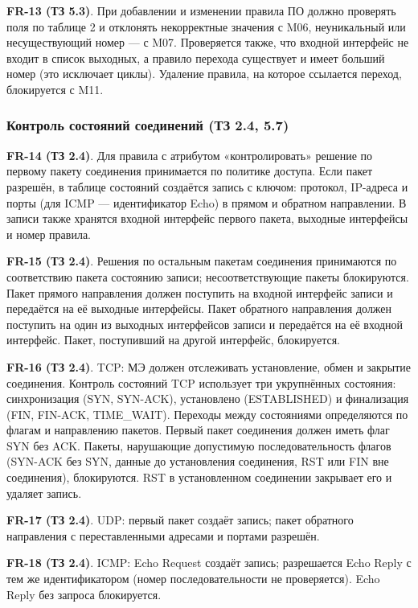 \documentclass[13pt,a4paper,final]{article}
\begin{document}
	\textbf{FR-13 (ТЗ 5.3)}. При добавлении и изменении правила ПО должно проверять поля по таблице 2 и отклонять некорректные значения с M06, неуникальный или несуществующий номер — с M07. Проверяется также, что входной интерфейс не входит в список выходных, а правило перехода существует и имеет больший номер (это исключает циклы). Удаление правила, на которое ссылается переход, блокируется с M11.
	
	\subsubsection{Контроль состояний соединений (ТЗ 2.4, 5.7)}
	
	\textbf{FR-14 (ТЗ 2.4)}. Для правила с атрибутом «контролировать» решение по первому пакету соединения принимается по политике доступа. Если пакет разрешён, в таблице состояний создаётся запись с ключом: протокол, IP-адреса и порты (для ICMP — идентификатор Echo) в прямом и обратном направлении. В записи также хранятся входной интерфейс первого пакета, выходные интерфейсы и номер правила.
	
	\textbf{FR-15 (ТЗ 2.4)}. Решения по остальным пакетам соединения принимаются по соответствию пакета состоянию записи; несоответствующие пакеты блокируются. Пакет прямого направления должен поступить на входной интерфейс записи и передаётся на её выходные интерфейсы. Пакет обратного направления должен поступить на один из выходных интерфейсов записи и передаётся на её входной интерфейс. Пакет, поступивший на другой интерфейс, блокируется.
	
	\textbf{FR-16 (ТЗ 2.4)}. TCP: МЭ должен отслеживать установление, обмен и закрытие соединения. Контроль состояний TCP использует три укрупнённых состояния: синхронизация (SYN, SYN-ACK), установлено (ESTABLISHED) и финализация (FIN, FIN-ACK, TIME\_WAIT). Переходы между состояниями определяются по флагам и направлению пакетов. Первый пакет соединения должен иметь флаг SYN без ACK. Пакеты, нарушающие допустимую последовательность флагов (SYN-ACK без SYN, данные до установления соединения, RST или FIN вне соединения), блокируются. RST в установленном соединении закрывает его и удаляет запись.
	
	\textbf{FR-17 (ТЗ 2.4)}. UDP: первый пакет создаёт запись; пакет обратного направления с переставленными адресами и портами разрешён.
	
	\textbf{FR-18 (ТЗ 2.4)}. ICMP: Echo Request создаёт запись; разрешается Echo Reply с тем же идентификатором (номер последовательности не проверяется). Echo Reply без запроса блокируется.
	
\end{document}
